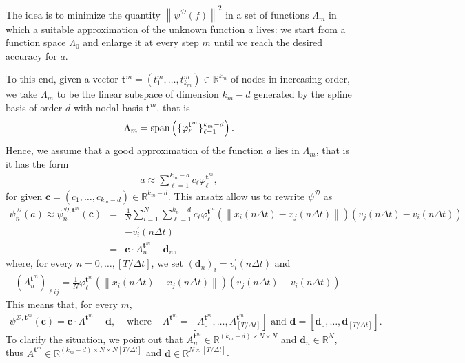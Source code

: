 \documentclass[A4paper,11pt]{article}
\theoremstyle{definition}
\newcommand{\vnorm}[1]{\left\| #1 \right\|}
\begin{document}
The idea is to minimize the quantity $\vnorm{\psi^{\mathcal{D}}(f)}^2$ in a set of functions $\Lambda_m$ in which a suitable approximation of the unknown function $a$ lives: we start from a function space $\Lambda_0$ and enlarge it at every step $m$ until we reach the desired accuracy for $a$. 

To this end, given a vector $\mathbf{t}^m = (t^m_1, \ldots, t^m_{k_m}) \in \mathbb{R}^{k_m}$ of nodes in increasing order, we take $\Lambda_m$ to be the linear subspace of dimension $k_m - d$ generated by the spline basis of order $d$ with nodal basis $\mathbf{t}^m$, that is
\begin{align*}
\Lambda_m = \textup{span}\left(\{\varphi^{\mathbf{t}^m}_{\ell}\}_{\ell = 1}^{k_{m}-d}\right).
\end{align*}
Hence, we assume that a good approximation of the function $a$ lies in $\Lambda_m$, that is it has the form
\begin{align*}
a \approx \sum^{k_{m}-d}_{\ell = 1} c_{\ell} \varphi^{\mathbf{t}^m}_{\ell},
\end{align*}
for given $\mathbf{c} = (c_1, \ldots, c_{k_m - d}) \in \mathbb{R}^{k_m - d}$. This ansatz allow us to rewrite $\psi^{\mathcal{D}}$ as
\begin{eqnarray*}
\psi^{\mathcal{D}}_n(a) \approx \psi^{\mathcal{D}, \mathbf{t}^m}_n(\mathbf{c}) & = & \frac{1}{N} \sum^N_{i = 1} \sum^{k_{n}-d}_{\ell = 1} c_{\ell} \varphi^{\mathbf{t}^m}_{\ell} \!\! \left(\vnorm{x_i(n \Delta t) - x_j(n \Delta t)}\right)(v_j(n \Delta t) - v_i(n \Delta t)) \\
& & - v^{\prime}_i(n \Delta t) \\
& = & \mathbf{c} \cdot A^{\mathbf{t}^m}_n - \mathbf{d}_n,
\end{eqnarray*}
where, for every $n = 0, \ldots, [T/\Delta t]$, we set $(\mathbf{d}_n)_i = v^{\prime}_i(n \Delta t)$ and
\begin{align*}
(A_n^{\mathbf{t}^m})_{\ell ij} = \frac{1}{N} \varphi^{\mathbf{t}^m}_{\ell} \left(\vnorm{x_i(n \Delta t) - x_j(n \Delta t)}\right)(v_j(n \Delta t) - v_i(n \Delta t)).
\end{align*}
This means that, for every $m$,
\begin{eqnarray*}
\psi^{\mathcal{D}, \mathbf{t}^m}(\mathbf{c}) = \mathbf{c} \cdot A^{\mathbf{t}^m} - \mathbf{d}, & \text{ where } & A^{\mathbf{t}^m} = [A^{\mathbf{t}^m}_0, \ldots, A^{\mathbf{t}^m}_{[T/\Delta t]}] \text{ and } \mathbf{d} = [\mathbf{d}_0, \ldots, \mathbf{d}_{[T/\Delta t]}].
\end{eqnarray*}
To clarify the situation, we point out that $A_n^{\mathbf{t}^m} \in \mathbb{R}^{(k_m - d)\times N \times N}$ and $\mathbf{d}_n  \in \mathbb{R}^N$, thus $A^{\mathbf{t}^m} \in \mathbb{R}^{(k_m - d) \times N \times N [T/\Delta t]}$ and $\mathbf{d} \in \mathbb{R}^{N \times [T/\Delta t]}$.
\end{document}
